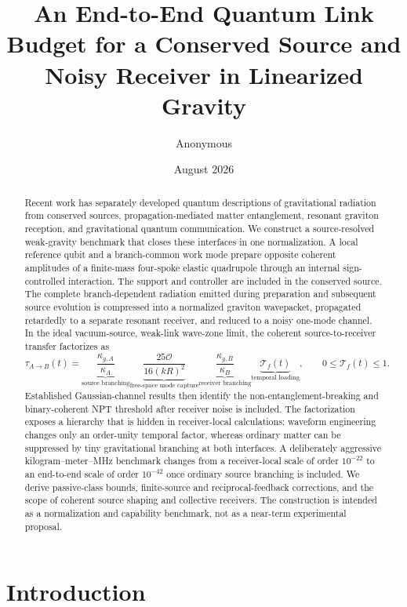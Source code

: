 \documentclass[11pt]{article}
\title{An End-to-End Quantum Link Budget for a Conserved Source and Noisy Receiver in Linearized Gravity}
\author{Anonymous}
\date{August 2026}
\begin{document}
\maketitle

\begin{abstract}
Recent work has separately developed quantum descriptions of gravitational radiation from conserved sources, propagation-mediated matter entanglement, resonant graviton reception, and gravitational quantum communication. We construct a source-resolved weak-gravity benchmark that closes these interfaces in one normalization. A local reference qubit and a branch-common work mode prepare opposite coherent amplitudes of a finite-mass four-spoke elastic quadrupole through an internal sign-controlled interaction. The support and controller are included in the conserved source. The complete branch-dependent radiation emitted during preparation and subsequent source evolution is compressed into a normalized graviton wavepacket, propagated retardedly to a separate resonant receiver, and reduced to a noisy one-mode channel. In the ideal vacuum-source, weak-link wave-zone limit, the coherent source-to-receiver transfer factorizes as
\begin{equation}
\tau_{A\to B}(t)
=
\underbrace{\frac{\kappa_{g,A}}{\kappa_A}}_{\text{source branching}}
\underbrace{\frac{25\mathcal O}{16(kR)^2}}_{\text{free-space mode capture}}
\underbrace{\frac{\kappa_{g,B}}{\kappa_B}}_{\text{receiver branching}}
\underbrace{\mathcal T_f(t)}_{\text{temporal loading}},
\qquad
0\le \mathcal T_f(t)\le 1.
\end{equation}
Established Gaussian-channel results then identify the non-entanglement-breaking and binary-coherent NPT threshold after receiver noise is included. The factorization exposes a hierarchy that is hidden in receiver-local calculations: waveform engineering changes only an order-unity temporal factor, whereas ordinary matter can be suppressed by tiny gravitational branching at both interfaces. A deliberately aggressive kilogram--meter--MHz benchmark changes from a receiver-local scale of order $10^{-22}$ to an end-to-end scale of order $10^{-42}$ once ordinary source branching is included. We derive passive-class bounds, finite-source and reciprocal-feedback corrections, and the scope of coherent source shaping and collective receivers. The construction is intended as a normalization and capability benchmark, not as a near-term experimental proposal.
\end{abstract}

\section{Introduction}
\end{document}
